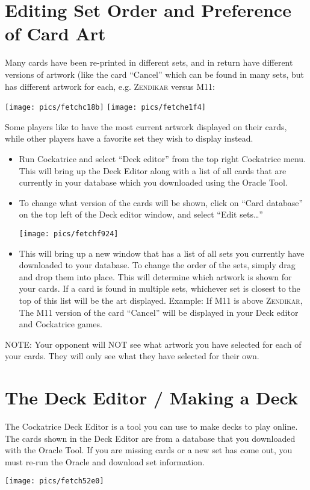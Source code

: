 \documentclass[a4paper]{scrbook}
\begin{document}
\section{Editing Set Order and Preference of Card Art}
Many cards have been re-printed in different sets, and in return have different versions of artwork (like the card “Cancel” which can be found in many sets, but has different artwork for each, e.g. \textsc{Zendikar} versus \textsc{M11}:
\begin{center}
\texttt{[image: pics/fetchc18b]}
\texttt{[image: pics/fetche1f4]}
\end{center}

Some players like to have the most current artwork displayed on their cards, while other players have a favorite set they wish to display instead.

\begin{itemize}
 \item Run Cockatrice and select “Deck editor” from the top right Cockatrice menu. This will bring up the Deck Editor along with a list of all cards that are currently in your database which you downloaded using the Oracle Tool.
 \item To change what version of the cards will be shown, click on “Card database” on the top left of the Deck editor window, and select “Edit sets…”
  \begin{center}
\texttt{[image: pics/fetchf924]}
 \end{center}
 \item This will bring up a new window that has a list of all sets you currently have downloaded to your database. To change the order of the sets, simply drag and drop them into place.
 This will determine which artwork is shown for your cards. If a card is found in multiple sets, whichever set is closest to the top of this list will be the art displayed.
 Example: If \textsc{M11} is above \textsc{Zendikar}, The M11 version of the card “Cancel” will be displayed in your Deck editor and Cockatrice games.
\end{itemize}
NOTE: Your opponent will NOT see what artwork you have selected for each of your cards. They will only see what they have selected for their own. 

\section{The Deck Editor / Making a Deck}
The Cockatrice Deck Editor is a tool you can use to make decks to play online.
The cards shown in the Deck Editor are from a database that you downloaded with the Oracle Tool. If you are missing cards or a new set has come out, you must re-run the Oracle and download set information.
\begin{center}
\texttt{[image: pics/fetch52e0]}
\end{center}
\end{document}
